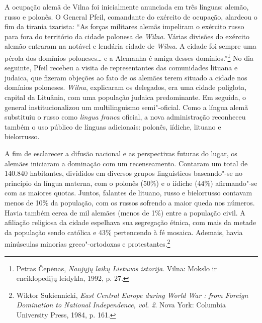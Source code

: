 A ocupação alemã de Vilna foi inicialmente anunciada em três línguas:
alemão, russo e polonês. O General Pfeil, comandante do exército de
ocupação, alardeou o fim da tirania tzarista: ``As forças militares
alemãs impeliram o exército russo para fora do território da cidade
polonesa de \textit{Wilna}. Várias divisões do exército alemão entraram na
notável e lendária cidade de \textit{Wilna}. A cidade foi sempre uma pérola dos
domínios poloneses\ldots{} e a Alemanha é amiga desses
domínios.''\footnote{Petras Čepėnas, \textit{Naujųjų laikų Lietuvos istorija}. Vilna: Mokslo ir enciklopedijų leidykla, 1992, p. 27.} No dia seguinte, Pfeil recebeu a visita de representantes das comunidades lituana e judaica, que fizeram objeções ao fato de os
alemães terem situado a cidade nos domínios poloneses. \textit{Wilna}, explicaram
os delegados, era uma cidade poliglota, capital da Lituânia, com uma
população judaica predominante. Em seguida, o general institucionalizou
um multilinguismo semi"-oficial. Como a língua alemã substituiu o russo
como \textit{lingua franca} oficial, a nova administração reconheceu
também o uso público de línguas adicionais: polonês, iídiche, lituano e
bielorrusso.

A fim de esclarecer a difusão nacional e as perspectivas futuras do
lugar, os alemães iniciaram a dominação com um recenseamento. Contaram
um total de 140.840 habitantes, divididos em diversos grupos
linguísticos baseando"-se no princípio da língua materna, com o polonês
(50\%) e o iídiche (44\%) afirmando"-se com as maiores quotas. Juntos,
falantes de lituano, russo e bielorrusso contavam menos de 10\% da
população, com os russos sofrendo a maior queda nos números. Havia
também cerca de mil alemães (menos de 1\%) entre a população civil. A
afiliação religiosa da cidade espelhava sua segregação étnica, com mais
da metade da população sendo católica e 43\% pertencendo à fé mosaica.
Ademais, havia minúsculas minorias greco"-ortodoxas e
protestantes.\footnote{Wiktor Sukiennicki, \textit{East Central Europe during World War : from Foreign Domination to National Independence, vol. 2}. Nova York: Columbia University Press, 1984, p. 161.}

